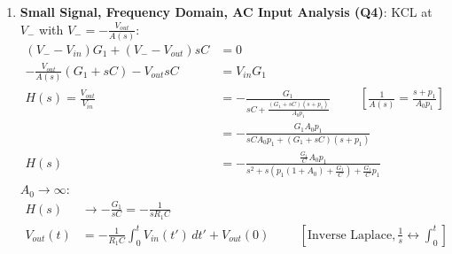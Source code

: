 \begin{enumerate}
    For \(t \ll T_c\), \(e^{-\frac{t}{T_c}} \approx 1 - \frac{t}{T_c}\):
    \begin{align*}
      V_{OUT}(t) &\approx -A_0 V_{IN}\frac{t}{T_c} = -\frac{A_0}{1 + A_0}\cdot\frac{V_{IN}}{R_1 C} t \xrightarrow{A_0 \to \infty} -\frac{V_{IN}}{R_1 C} t
    \end{align*}
    a ramp, valid while \(V_{OL} \leq V_{OUT} \leq V_{OH}\).
  \item \textbf{Small Signal, Frequency Domain, AC Input Analysis (Q4)}: KCL at \(V_-\)
    with \(V_- = -\frac{V_{out}}{A(s)}\):
    \begin{align*}
      (V_- - V_{in}) G_1 + (V_- - V_{out}) sC &= 0 \\
      -\frac{V_{out}}{A(s)}(G_1 + sC) - V_{out} sC &= V_{in} G_1 \\
      H(s) = \frac{V_{out}}{V_{in}} &= -\frac{G_1}{sC + \frac{(G_1 + sC)(s + p_1)}{A_0 p_1}} \hspace{1cm} \left[\tfrac{1}{A(s)} = \tfrac{s + p_1}{A_0 p_1}\right] \\
      &= -\frac{G_1 A_0 p_1}{sC A_0 p_1 + (G_1 + sC)(s + p_1)} \\
      H(s) &= -\frac{\frac{G_1}{C} A_0 p_1}{s^2 + s\left(p_1(1 + A_0) + \frac{G_1}{C}\right) + \frac{G_1}{C} p_1} \tag{3}
    \end{align*}
    \(A_0 \to \infty\):
    \begin{align*}
      H(s) &\to -\frac{G_1}{sC} = -\frac{1}{s R_1 C} \\
      V_{out}(t) &= -\frac{1}{R_1 C}\int_0^t V_{in}(t')\, dt' + V_{out}(0) \hspace{1cm} [\text{Inverse Laplace}, \tfrac{1}{s} \leftrightarrow \textstyle\int_0^t]
    \end{align*}
\end{enumerate}

